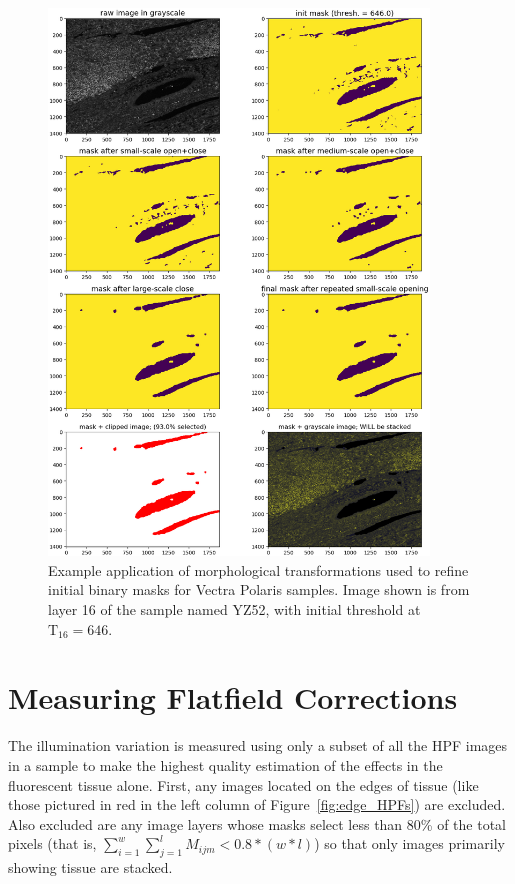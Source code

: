 \documentclass[letterpaper,11pt]{article}
\newcommand{\reffig}[1]{Figure~\ref{#1}}
\newcommand{\Tau}{\mathrm{T}}
\begin{document}
\begin{figure}[!ht]
\centering
\includegraphics[width=0.9\textwidth]{images/masking/image_84_layer_16_masks}
\caption{\footnotesize Example application of morphological transformations used to refine initial binary masks for Vectra Polaris samples. Image shown is from layer 16 of the sample named YZ52, with initial threshold at $\Tau_{16}=646$.}
\label{fig:mask_example_polaris_max}
\end{figure}

\clearpage

\section{Measuring Flatfield Corrections}
\label{sec:measuring_flatfield_corrections}

The illumination variation is measured using only a subset of all the HPF images in a sample to make the highest quality estimation of the effects in the fluorescent tissue alone. First, any images located on the edges of tissue (like those pictured in red in the left column of \reffig{fig:edge_HPFs}) are excluded. Also excluded are any image layers whose masks select less than 80\% of the total pixels (that is, $\sum_{i=1}^{w}\sum_{j=1}^{l}M_{ijm}<0.8*(w*l)$) so that only images primarily showing tissue are stacked. 
\end{document}
